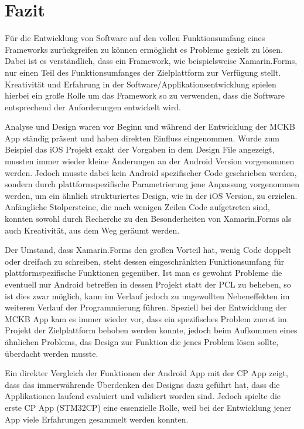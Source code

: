 %
%
% 
% 


\chapter{Fazit}
\label{chap:xamarinformsconclusion}

	Für die Entwicklung von Software auf den vollen Funktionsumfang eines Frameworks zurückgreifen zu können ermöglicht es Probleme gezielt zu lösen. Dabei ist es verständlich, dass ein Framework, wie beispielsweise Xamarin.Forms, nur einen Teil des Funktionsumfanges der Zielplattform zur Verfügung stellt. Kreativität und Erfahrung in der Software/Applikationsentwicklung spielen hierbei ein große Rolle um das Framework so zu verwenden, dass die Software entsprechend der Anforderungen entwickelt wird.

	Analyse und Design waren vor Beginn und während der Entwicklung der MCKB App ständig präsent und haben direkten Einfluss eingenommen. Wurde zum Beispiel das iOS Projekt exakt der Vorgaben in dem Design File angezeigt, mussten immer wieder kleine Änderungen an der Android Version vorgenommen werden. Jedoch musste dabei kein Android spezifischer Code geschrieben werden, sondern durch plattformspezifische Parametrierung jene Anpassung vorgenommen werden, um ein ähnlich strukturiertes Design, wie in der iOS Version, zu erzielen. Anfängliche Stolpersteine, die nach wenigen Zeilen Code aufgetreten sind, konnten sowohl durch Recherche zu den Besonderheiten von Xamarin.Forms als auch Kreativität, aus dem Weg geräumt werden.

	Der Umstand, dass Xamarin.Forms den großen Vorteil hat, wenig Code doppelt oder dreifach zu schreiben, steht dessen eingeschränkten Funktionsumfang für plattformspezifische Funktionen gegenüber. Ist man es gewohnt Probleme die eventuell nur Android betreffen in dessen Projekt statt der PCL zu beheben, so ist dies zwar möglich, kann im Verlauf jedoch zu ungewollten Nebeneffekten im weiteren Verlauf der Programmierung führen. Speziell bei der Entwicklung der MCKB App kam es immer wieder vor, dass ein spezifisches Problem zuerst im Projekt der Zielplattform behoben werden konnte, jedoch beim Aufkommen eines ähnlichen Problems, das Design zur Funktion die jenes Problem lösen sollte, überdacht werden musste.

	Ein direkter Vergleich der Funktionen der Android App mit der CP App zeigt, dass das immerwährende Überdenken des Designs dazu geführt hat, dass die Applikationen laufend evaluiert und validiert worden sind. Jedoch spielte die erste CP App (STM32CP) eine essenzielle Rolle, weil bei der Entwicklung jener App viele Erfahrungen gesammelt werden konnten.
